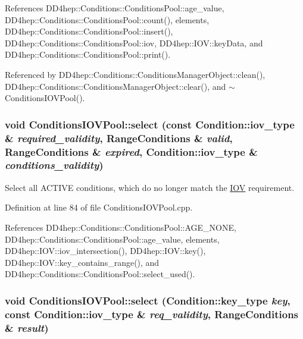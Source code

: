 References DD4hep::Conditions::ConditionsPool::age\_\-value, DD4hep::Conditions::ConditionsPool::count(), elements, DD4hep::Conditions::ConditionsPool::insert(), DD4hep::Conditions::ConditionsPool::iov, DD4hep::IOV::keyData, and DD4hep::Conditions::ConditionsPool::print().

Referenced by DD4hep::Conditions::ConditionsManagerObject::clean(), DD4hep::Conditions::ConditionsManagerObject::clear(), and $\sim$ConditionsIOVPool().\hypertarget{class_d_d4hep_1_1_conditions_1_1_conditions_i_o_v_pool_ae7ff2198bcdc12e8be275d1aacc5cd0b}{
\subsubsection[{select}]{\setlength{\rightskip}{0pt plus 5cm}void ConditionsIOVPool::select (const {\bf Condition::iov\_\-type} \& {\em required\_\-validity}, \/  {\bf RangeConditions} \& {\em valid}, \/  {\bf RangeConditions} \& {\em expired}, \/  {\bf Condition::iov\_\-type} \& {\em conditions\_\-validity})}}
\label{class_d_d4hep_1_1_conditions_1_1_conditions_i_o_v_pool_ae7ff2198bcdc12e8be275d1aacc5cd0b}


Select all ACTIVE conditions, which do no longer match the \hyperlink{class_d_d4hep_1_1_i_o_v}{IOV} requirement. 

Definition at line 84 of file ConditionsIOVPool.cpp.

References DD4hep::Conditions::ConditionsPool::AGE\_\-NONE, DD4hep::Conditions::ConditionsPool::age\_\-value, elements, DD4hep::IOV::iov\_\-intersection(), DD4hep::IOV::key(), DD4hep::IOV::key\_\-contains\_\-range(), and DD4hep::Conditions::ConditionsPool::select\_\-used().\hypertarget{class_d_d4hep_1_1_conditions_1_1_conditions_i_o_v_pool_a75f43e7cd7cbc5c07afb0aca2b241a41}{
\subsubsection[{select}]{\setlength{\rightskip}{0pt plus 5cm}void ConditionsIOVPool::select ({\bf Condition::key\_\-type} {\em key}, \/  const {\bf Condition::iov\_\-type} \& {\em req\_\-validity}, \/  {\bf RangeConditions} \& {\em result})}}
\label{class_d_d4hep_1_1_conditions_1_1_conditions_i_o_v_pool_a75f43e7cd7cbc5c07afb0aca2b241a41}



